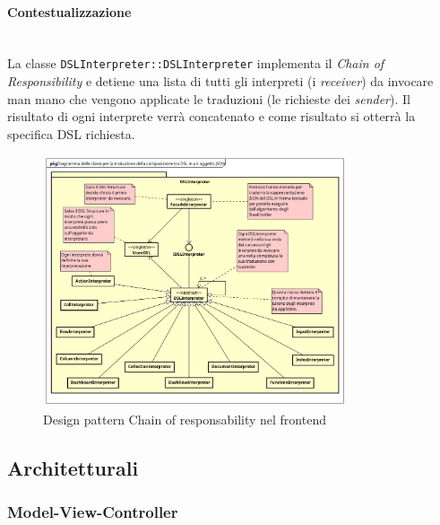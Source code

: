 \paragraph{Contestualizzazione}\mbox{} \\
La classe \texttt{DSLInterpreter::DSLInterpreter} implementa il \textit{Chain of Responsibility} e detiene una lista di tutti gli interpreti (i \textit{receiver}) da invocare man mano che vengono applicate le traduzioni (le richieste dei \textit{sender}). Il risultato di ogni interprete verrà concatenato e come risultato si otterrà la specifica DSL richiesta.
\begin{figure}[H]
\centering
\includegraphics[width=0.8\textwidth]{res/sections/frontend/chainOfResponsability.png}
\caption{Design pattern Chain of responsability nel frontend}
\end{figure}
\subsection{Architetturali}
\subsubsection{Model-View-Controller}
